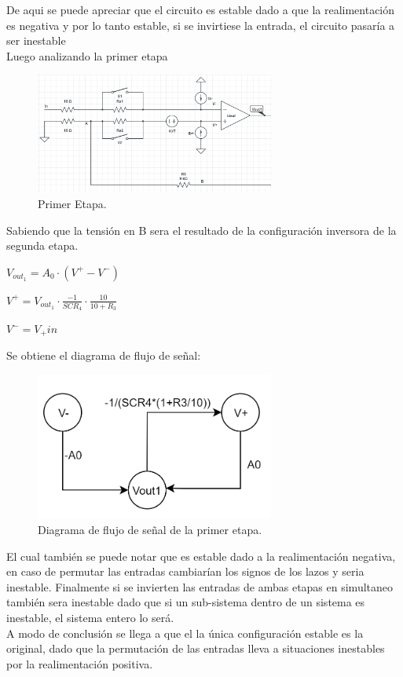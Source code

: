 De aqui se puede apreciar que el circuito es estable dado a que la realimentación es negativa y por lo tanto estable, si se invirtiese la entrada, el circuito pasaría a ser inestable\\
Luego analizando la primer etapa
\begin{figure}[H]	
	\centering
	\includegraphics[width=0.7\textwidth]{Ej3/imagenes/PrimeraEtapa.PNG}
	\caption{Primer Etapa.}
	\label{fig:PrimerEtapa}
\end{figure}
Sabiendo que la tensión en B sera el resultado de la configuración inversora de la segunda etapa.\\
\begin{center}$V_{out_1}=A_0 \cdot (V^+ - V^-)$\\\end{center}
\begin{center}$V^+= V_{out_1}\cdot \frac{-1}{SCR_4} \cdot \frac{10}{10+R_3} $\\\end{center}
\begin{center}$V^- = V_+{in}$\\\end{center}
Se obtiene el diagrama de flujo de señal:
\begin{figure}[H]	
	\centering
	\includegraphics[width=0.7\textwidth]{Ej3/imagenes/PrimerEtapaDiagrama.PNG}
	\caption{Diagrama de flujo de señal de la primer etapa.}
	\label{fig:PrimerEtapaDiagrama}
\end{figure}
El cual también se puede notar que es estable dado a la realimentación negativa, en caso de permutar las entradas cambiarían los signos de los lazos y seria inestable.
Finalmente si se invierten las entradas de ambas etapas en simultaneo también sera inestable dado que si un sub-sistema dentro de un sistema es inestable, el sistema entero lo será.\\
A modo de conclusión se llega a que el la única configuración estable es la original, dado que la permutación de las entradas lleva a situaciones inestables por la realimentación positiva.
